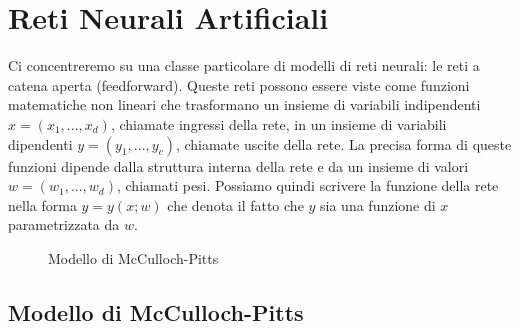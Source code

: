\documentclass[11pt,a4paper,twoside,
openright]{book}
\newcommand{\addsymbol}{\draw[thick] (0.5em,0.5em) -- (0,0.5em) -- 
                        (0,-0.5em) --  (-0.5em,-0.5em)
                        (0em,0.75em) -- (0em,-0.75em)
                        (0.75em,0em) -- (-0.75em,0em);}
\begin{document}
\section{Reti Neurali Artificiali}
Ci concentreremo su una classe particolare di modelli di reti neurali: le reti a catena aperta (feedforward). Queste reti possono essere viste come funzioni matematiche non lineari che trasformano un insieme di variabili indipendenti $x = (x_{1}, ... , x_{d})$, chiamate ingressi della rete, in un insieme di variabili dipendenti $y = (y_{1}, ... , y_{c})$, chiamate uscite della rete. La precisa forma di queste funzioni dipende dalla struttura interna della rete e da un insieme di valori $w = (w_{1}, ... , w_{d})$, chiamati pesi. Possiamo quindi scrivere la funzione della rete nella forma $y = y(x; w)$ che denota il fatto che $y$ sia una funzione di $x$ parametrizzata da $w$.

\begin{figure}[h!]
\begin{center}
\end{center}
\caption{Modello di McCulloch-Pitts}
\label{fig:mcpitts}
\end{figure}
\subsection*{Modello di McCulloch-Pitts}
\end{document}
